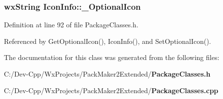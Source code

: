 \subsubsection{\setlength{\rightskip}{0pt plus 5cm}wx\-String {\bf Icon\-Info::\_\-Optional\-Icon}\hspace{0.3cm}{\tt  [private]}}\label{class_icon_info_c7e4f644e5530cf8deb75b1076ea140f}




Definition at line 92 of file Package\-Classes.h.

Referenced by Get\-Optional\-Icon(), Icon\-Info(), and Set\-Optional\-Icon().

The documentation for this class was generated from the following files:\begin{CompactItemize}
\item 
C:/Dev-Cpp/Wx\-Projects/Pack\-Maker2Extended/{\bf Package\-Classes.h}\item 
C:/Dev-Cpp/Wx\-Projects/Pack\-Maker2Extended/{\bf Package\-Classes.cpp}\end{CompactItemize}
